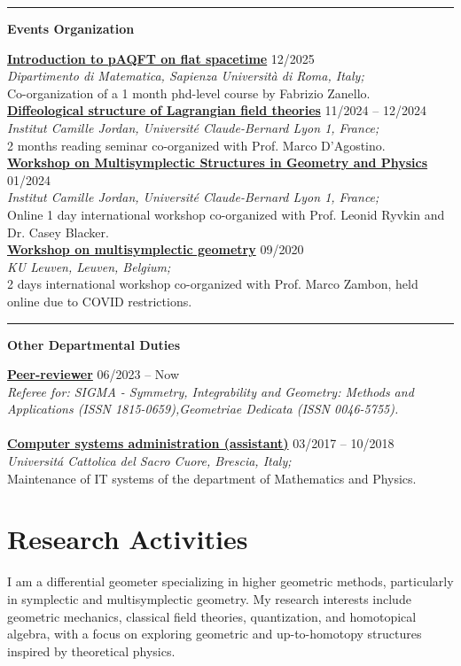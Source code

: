 \documentclass[a4paper]{article}
\newcommand{\block}[1]{\hrule \vspace{0.2cm} \textbf{\Large #1} \vspace{0.2cm}}
\newcommand{\voice}[5]{\href{#4}{\textbf{#1}} \hfill #2 \\ \textit{#3} \\ {\small #5} \vspace{0.2cm} \\}
\newcommand{\txt}[1]{#1\\}
\begin{document}
	\block{Events Organization}

    \voice{Introduction to pAQFT on flat spacetime}
        {12/2025}
        {Dipartimento di Matematica, Sapienza Università di Roma, Italy;}
        {https://www.antoniomiti.it/teaching/aqft-2025/}       
        {Co-organization of a 1 month phd-level course by Fabrizio Zanello.}	
	\voice{Diffeological structure of Lagrangian field theories}
		{11/2024 -- 12/2024}
		{Institut Camille Jordan, Université Claude-Bernard Lyon 1, France;}
		{https://www.antoniomiti.it/teaching/LFT-2024/}       
		{2 months reading seminar co-organized with Prof. Marco D'Agostino.}
	\voice{Workshop on Multisymplectic Structures in Geometry and Physics}
		{01/2024}
		{Institut Camille Jordan, Université Claude-Bernard Lyon 1, France;}
		{https://math.gmu.edu/~cblacke/lyon.html}       
		{Online 1 day international workshop co-organized with Prof. Leonid Ryvkin and Dr. Casey Blacker.}
	\voice{Workshop on multisymplectic geometry}
		{09/2020}
		{KU Leuven, Leuven, Belgium;}
		{https://wis.kuleuven.be/events/multisymplectic}       
		{2 days international workshop co-organized with Prof. Marco Zambon, held online due to COVID restrictions.}

	\block{Other Departmental Duties}

	\voice{Peer-reviewer}
		{06/2023 -- Now}
		{Referee for: SIGMA - Symmetry, Integrability and Geometry: Methods and Applications (ISSN 1815-0659),Geometriae Dedicata (ISSN 0046-5755).}
		{}
        {\vspace{-0.5cm}}
	\voice{Computer systems administration (assistant)}
		{03/2017 -- 10/2018}
		{Universit\'a Cattolica del Sacro Cuore, Brescia, Italy;}
		{https://dipartimenti.unicatt.it/dmf-home}       
		{Maintenance of IT systems of the department of Mathematics and Physics.}

	\clearpage
	\section*{Research Activities}

	\txt{I am a differential geometer specializing in higher geometric methods, particularly in symplectic and multisymplectic geometry. My research interests include geometric mechanics, classical field theories, quantization, and homotopical algebra, with a focus on exploring geometric and up-to-homotopy structures inspired by theoretical physics. }
	
\end{document}
